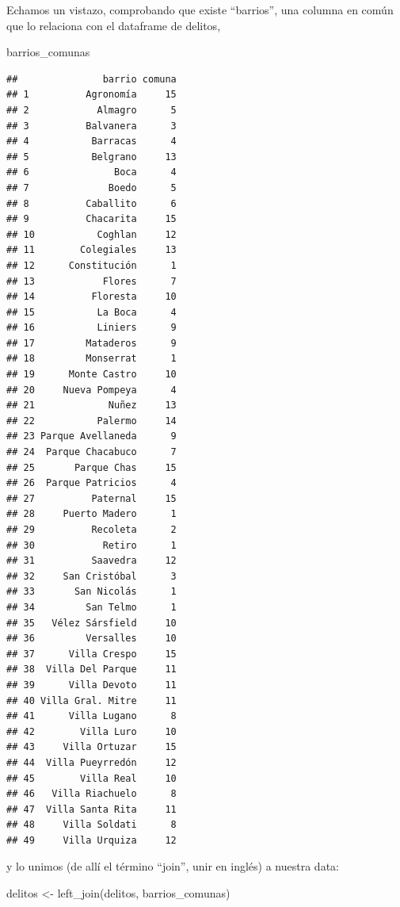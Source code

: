 \documentclass[
]{book}
\newenvironment{Shaded}{\begin{snugshade}}{\end{snugshade}}
\newcommand{\FunctionTok}[1]{\textcolor[rgb]{0.00,0.00,0.00}{#1}}
\newcommand{\NormalTok}[1]{#1}
\newcommand{\OtherTok}[1]{\textcolor[rgb]{0.56,0.35,0.01}{#1}}
\begin{document}
Echamos un vistazo, comprobando que existe ``barrios'', una columna en común que lo relaciona con el dataframe de delitos,

\begin{Shaded}
\begin{Highlighting}[]
\NormalTok{barrios\_comunas}
\end{Highlighting}
\end{Shaded}

\begin{verbatim}
##               barrio comuna
## 1          Agronomía     15
## 2            Almagro      5
## 3          Balvanera      3
## 4           Barracas      4
## 5           Belgrano     13
## 6               Boca      4
## 7              Boedo      5
## 8          Caballito      6
## 9          Chacarita     15
## 10           Coghlan     12
## 11        Colegiales     13
## 12      Constitución      1
## 13            Flores      7
## 14          Floresta     10
## 15           La Boca      4
## 16           Liniers      9
## 17         Mataderos      9
## 18         Monserrat      1
## 19      Monte Castro     10
## 20     Nueva Pompeya      4
## 21             Nuñez     13
## 22           Palermo     14
## 23 Parque Avellaneda      9
## 24  Parque Chacabuco      7
## 25       Parque Chas     15
## 26  Parque Patricios      4
## 27          Paternal     15
## 28     Puerto Madero      1
## 29          Recoleta      2
## 30            Retiro      1
## 31          Saavedra     12
## 32     San Cristóbal      3
## 33       San Nicolás      1
## 34         San Telmo      1
## 35   Vélez Sársfield     10
## 36         Versalles     10
## 37      Villa Crespo     15
## 38  Villa Del Parque     11
## 39      Villa Devoto     11
## 40 Villa Gral. Mitre     11
## 41      Villa Lugano      8
## 42        Villa Luro     10
## 43     Villa Ortuzar     15
## 44  Villa Pueyrredón     12
## 45        Villa Real     10
## 46   Villa Riachuelo      8
## 47  Villa Santa Rita     11
## 48     Villa Soldati      8
## 49     Villa Urquiza     12
\end{verbatim}

y lo unimos (de allí el término ``join'', unir en inglés) a nuestra data:

\begin{Shaded}
\begin{Highlighting}[]
\NormalTok{delitos }\OtherTok{\textless{}{-}} \FunctionTok{left\_join}\NormalTok{(delitos, barrios\_comunas)}
\end{Highlighting}
\end{Shaded}
\end{document}
